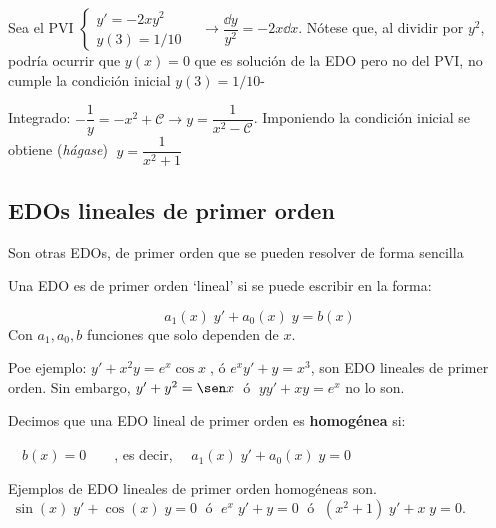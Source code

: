 \begin{ejem}
Sea el PVI $\begin{cases}  y'= -2x y^2 \\ y(3)=1/10 \end{cases}\quad \to \dfrac {\dd y}{y^2}=-2x \dd x $. Nótese que, al dividir por $y^2$, podría ocurrir que $y(x)=0$ que es solución de la EDO pero no del PVI, no cumple la condición inicial $y(3)=1/10$-

Integrado: $-\dfrac 1 y = -x^2+\mathcal C \to y=\dfrac {1}{x^2 - \mathcal C}$. Imponiendo la condición inicial se obtiene (\emph{hágase}) $\; y=\dfrac {1}{x^2 + 1}$
\end{ejem}

\subsection{EDOs lineales de primer orden}

Son otras EDOs, de primer orden que se pueden resolver de forma sencilla

\begin{defi}
Una EDO es de primer orden `lineal' si se puede escribir en la forma:

\begin{equation*}
	\boxed{\; a_1(x)\; y' +a_0(x)\; y = b(x)\;} 
\end{equation*}	
Con $a_1, a_0, b$ funciones que solo dependen de $x$.
\end{defi}

Poe ejemplo: $y'+x^2y=e^x \cos x\; $, ó \; $e^x y' +y =x^3$, son EDO lineales de primer orden. Sin embargo, $y'+y^2=\sen x\; $ ó $\; yy'+xy=e^x$ no lo son.

\begin{defi}
Decimos que una EDO lineal de primer orden es \textbf{homogénea} si:

 $\quad b(x)=0\qquad$, es decir, $\quad  a_1(x)\; y' +a_0(x)\; y = 0$	
\end{defi}

Ejemplos de EDO lineales de primer orden homogéneas son. $\; \sin (x)\; y' + \cos(x)\; y = 0\; $ ó $\; e^x\; y'+y=0\; $ ó $\; (x^2+1) \; y'+x\; y=0$.

